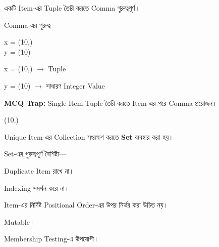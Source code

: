 

একটি Item-এর Tuple তৈরি করতে Comma গুরুত্বপূর্ণ।

\begin{codeoutputbox}{Comma-এর গুরুত্ব}

\noindent
\begin{minipage}[t]{0.48\linewidth}
\codeheading

\begin{english}
\ttfamily
x = (10,)\\
y = (10)
\end{english}

\end{minipage}
\hfill
\begin{minipage}[t]{0.48\linewidth}
\outputheading

\textenglish{\ttfamily x = (10,)}
\(\longrightarrow\)
Tuple

\medskip

\textenglish{\ttfamily y = (10)}
\(\longrightarrow\)
সাধারণ Integer Value

\end{minipage}

\end{codeoutputbox}

\begin{rememberbox}

\textbf{\color{deepOrange}MCQ Trap:}
Single Item Tuple তৈরি করতে Item-এর পরে Comma প্রয়োজন।

\begin{center}
\textenglish{\ttfamily (10,)}
\end{center}

\end{rememberbox}



Unique Item-এর Collection সংরক্ষণ করতে \textbf{Set} ব্যবহার করা হয়।

Set-এর গুরুত্বপূর্ণ বৈশিষ্ট্য—

\begin{compacttwocolpoints}

\item Duplicate Item রাখে না।

\item Indexing সমর্থন করে না।

\item Item-এর নির্দিষ্ট Positional Order-এর উপর নির্ভর করা উচিত নয়।

\item Mutable।

\item Membership Testing-এ উপযোগী।

\end{compacttwocolpoints}

